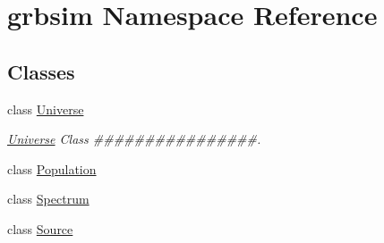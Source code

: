 \hypertarget{namespacegrbsim}{\section{grbsim Namespace Reference}
\label{namespacegrbsim}
}
\subsection*{Classes}
\begin{DoxyCompactItemize}
\item 
class \hyperlink{classgrbsim_1_1_universe}{Universe}
\begin{DoxyCompactList}\small\item\em \hyperlink{classgrbsim_1_1_universe}{Universe} Class \#\#\#\#\#\#\#\#\#\#\#\#\#\#\#\#. \end{DoxyCompactList}\item 
class \hyperlink{classgrbsim_1_1_population}{Population}
\item 
class \hyperlink{classgrbsim_1_1_spectrum}{Spectrum}
\item 
class \hyperlink{classgrbsim_1_1_source}{Source}
\end{DoxyCompactItemize}
